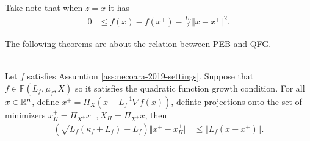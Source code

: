 \documentclass[12pt]{report}
\begin{document}
            Take note that when $z = x$ it has 
            \begin{align}\label{ineq:proj-grad2}
                0 &\le f(x) - f(x^+) - \frac{L_f}{2}\Vert x - x^+\Vert^2. 
            \end{align}
            \par
            The following theorems are about the relation between PEB and QFG.
            \begin{lemma}\;\label{lemma:grad-map-qfg}\\
                Let $f$ satisfies Assumtion \ref{ass:necoara-2019-settings}. 
                Suppose that $f \in \mathbb F(L_f, \mu_f, X)$ so it satisfies the quadratic function growth condition. 
                For all $x \in \mathbb R^n$, define $x^+ = \Pi_X(x - L^{-1}_f\nabla f(x))$, 
                definte projections onto the set of minimizers $x^+_\Pi = \Pi_{X^+} x^+, X_\Pi = \Pi_{X^+}x$, then
                \begin{align*}
                    \left(
                        \sqrt{L_f(\kappa_f + L_f)} - L_f
                    \right)\Vert x^+ - x_\Pi^+\Vert
                    &\le \Vert L_f(x - x^+)\Vert. 
                \end{align*}
            \end{lemma}
\end{document}

